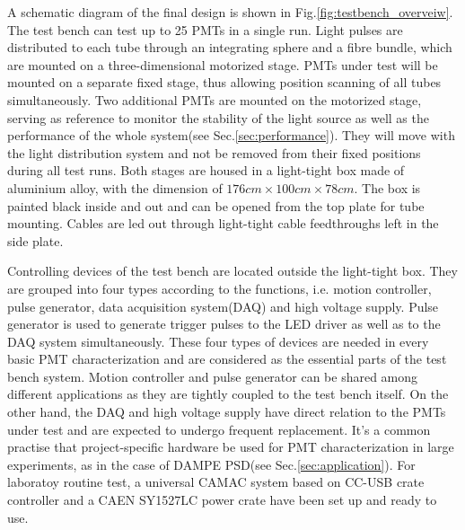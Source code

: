 \documentclass[5p, times]{elsarticle}
\begin{document}
A schematic diagram of the final design is shown in Fig.\ref{fig:testbench_overveiw}.
The test bench can test up to 25 PMTs in a single run.
Light pulses are distributed to each tube through an integrating sphere and a fibre bundle, which are mounted on a three-dimensional motorized stage.
PMTs under test will be mounted on a separate fixed stage, thus allowing position scanning of all tubes simultaneously.
Two additional PMTs are mounted on the motorized stage, serving as reference to monitor the stability of the light source as well as the performance of the whole system(see Sec.\ref{sec:performance}).
They will move with the light distribution system and not be removed from their fixed positions during all test runs. 
Both stages are housed in a light-tight box made of aluminium alloy, with the dimension of $176cm\times100cm\times78cm$.
The box is painted black inside and out and can be opened from the top plate for tube mounting.
Cables are led out through light-tight cable feedthroughs left in the side plate.

Controlling devices of the test bench are located outside the light-tight box.
They are grouped into four types according to the functions, i.e. motion controller, pulse generator, data acquisition system(DAQ) and high voltage supply.
Pulse generator is used to generate trigger pulses to the LED driver as well as to the DAQ system simultaneously.
These four types of devices are needed in every basic PMT characterization and are considered as the essential parts of the test bench system.
Motion controller and pulse generator can be shared among different applications as they are tightly coupled to the test bench itself.
On the other hand, the DAQ and high voltage supply have direct relation to the PMTs under test and are expected to undergo frequent replacement.
It's a common practise that project-specific hardware be used for PMT characterization in large experiments, as in the case of DAMPE PSD(see Sec.\ref{sec:application}).
For laboratoy routine test, a universal CAMAC system based on CC-USB crate controller and a CAEN SY1527LC power crate have been set up and ready to use.
\end{document}
